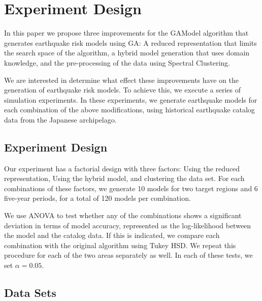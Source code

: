 


\section{Experiment Design}
\label{sec:experiment}

In this paper we propose three improvements for the GAModel algorithm
that generates earthquake risk models using GA: A reduced
representation that limits the search space of the algorithm, a hybrid
model generation that uses domain knowledge, and the pre-processing of
the data using Spectral Clustering.

We are interested in determine what effect these improvements have on
the generation of earthquake risk models. To achieve this, we execute
a series of simulation experiments. In these experiments, we generate
earthquake models for each combination of the above modifications,
using historical earthquake catalog data from the Japanese
archipelago.

\subsection{Experiment Design}


Our experiment has a factorial design with three factors: Using the
reduced representation, Using the hybrid model, and clustering the
data set. For each combinations of these factors, we generate 10 models
for two target regions and 6 five-year periods, for a total of 120
models per combination.

We use ANOVA to test whether any of the combinations shows a
significant deviation in terms of model accuracy, represented as the
log-likelihood between the model and the catalog data. If this is
indicated, we compare each combination with the original algorithm
using Tukey HSD. We repeat this procedure for each of the two areas
separately as well. In each of these tests, we set $\alpha = 0.05$.

\subsection{Data Sets}

